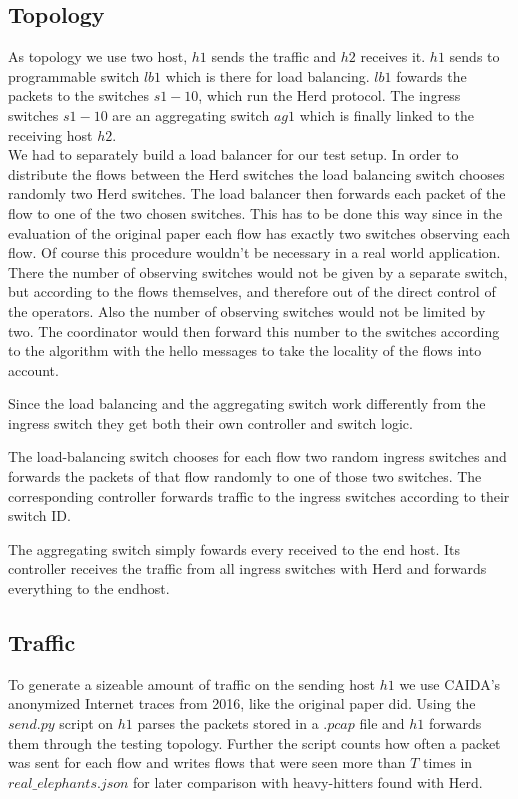 \documentclass[11pt,oneside,a4paper]{article}
\begin{document}
\subsection{Topology} \label{topology}
As topology we use two host, $h1$ sends the traffic and $h2$ receives it. $h1$ sends to programmable switch $lb1$ which is there for load balancing. $lb1$ fowards the packets to the switches $s1 - 10$, which run the Herd protocol. The ingress switches $s1 - 10$ are an aggregating switch $ag1$ which is finally linked to the receiving host $h2$.\\

We had to separately build a load balancer for our test setup. In order to distribute the flows between the Herd switches the load balancing switch chooses randomly two Herd switches. The load balancer then forwards each packet of the flow to one of the two chosen switches. This has to be done this way since in the evaluation of the original paper each flow has exactly two switches observing each flow. Of course this procedure wouldn't be necessary in a real world application. There the number of observing switches would not be given by a separate switch, but according to the flows themselves, and therefore out of the direct control of the operators. Also the number of observing switches would not be limited by two. The coordinator would then forward this number to the switches according to the algorithm with the hello messages to take the locality of the flows into account.

Since the load balancing and the aggregating switch work differently from the ingress switch they get both their own controller and switch logic.

The load-balancing switch chooses for each flow two random ingress switches and forwards the packets of that flow randomly to one of those two switches.
The corresponding controller forwards traffic to the ingress switches according to their switch ID.

The aggregating switch simply fowards every received to the end host.
Its controller receives the traffic from all ingress switches with Herd and forwards everything to the endhost.

\subsection{Traffic} \label{traffic}
To generate a sizeable amount of traffic on the sending host $h1$ we use CAIDA's anonymized Internet traces from 2016, like the original paper did. Using the $send.py$ script on $h1$ parses the packets stored in a $.pcap$ file and $h1$ forwards them through the testing topology. Further the script counts how often a packet was sent for each flow and writes flows that were seen more than $T$ times in $real\_elephants.json$ for later comparison with heavy-hitters found with Herd.
\end{document}
